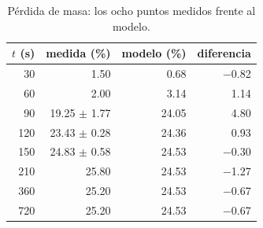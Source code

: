 \begin{table}[h]
\centering\small
\begin{tabular}{rrrr}
\toprule
$t$ (\si{\second}) & medida (\%) & modelo (\%) & diferencia \\
\midrule
30 & \num{1.50} & \num{0.68} & \num{-0.82} \\
60 & \num{2.00} & \num{3.14} & \num{1.14} \\
90 & \num{19.25} $\pm$ \num{1.77} & \num{24.05} & \num{4.80} \\
120 & \num{23.43} $\pm$ \num{0.28} & \num{24.36} & \num{0.93} \\
150 & \num{24.83} $\pm$ \num{0.58} & \num{24.53} & \num{-0.30} \\
210 & \num{25.80} & \num{24.53} & \num{-1.27} \\
360 & \num{25.20} & \num{24.53} & \num{-0.67} \\
720 & \num{25.20} & \num{24.53} & \num{-0.67} \\
\bottomrule
\end{tabular}
\caption{Pérdida de masa: los ocho puntos medidos frente al modelo.}
\end{table}
